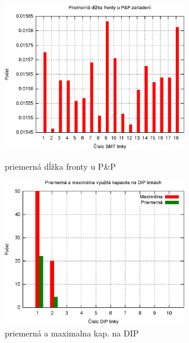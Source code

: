 \documentclass[12pt,a4paper,titlepage,final]{article}
\begin{document}
\begin{figure}[!ht]
  \centering
  \begin{minipage}{0.45\linewidth}
  \centering
  \includegraphics[width=8cm]{doc/2_hist3.eps}
  \caption{priemerná dĺžka fronty u P\&P}
  \end{minipage}
  \quad
  \begin{minipage}{0.45\linewidth}
    \centering
    \includegraphics[width=8cm]{doc/2_hist4.eps}
    \caption{priemerná a maximalna kap. na DIP}
  \end{minipage}
\end{figure}
\end{document}
